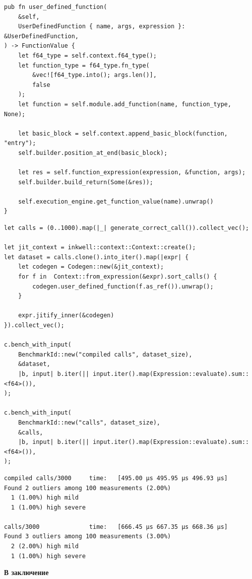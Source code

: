 \begin{frame}[fragile]
    \begin{verbatim}
pub fn user_defined_function(
    &self,
    UserDefinedFunction { name, args, expression }: &UserDefinedFunction,
) -> FunctionValue {
    let f64_type = self.context.f64_type();
    let function_type = f64_type.fn_type(
        &vec![f64_type.into(); args.len()],
        false
    );
    let function = self.module.add_function(name, function_type, None);

    let basic_block = self.context.append_basic_block(function, "entry");
    self.builder.position_at_end(basic_block);

    let res = self.function_expression(expression, &function, args);
    self.builder.build_return(Some(&res));

    self.execution_engine.get_function_value(name).unwrap()
}
    \end{verbatim}
\end{frame}

\begin{frame}[fragile]
    \begin{verbatim}
let calls = (0..1000).map(|_| generate_correct_call()).collect_vec();

let jit_context = inkwell::context::Context::create();
let dataset = calls.clone().into_iter().map(|expr| {
    let codegen = Codegen::new(&jit_context);
    for f in  Context::from_expression(&expr).sort_calls() {
        codegen.user_defined_function(f.as_ref()).unwrap();
    }

    expr.jitify_inner(&codegen)
}).collect_vec();

c.bench_with_input(
    BenchmarkId::new("compiled calls", dataset_size),
    &dataset,
    |b, input| b.iter(|| input.iter().map(Expression::evaluate).sum::<f64>()),
);

c.bench_with_input(
    BenchmarkId::new("calls", dataset_size),
    &calls,
    |b, input| b.iter(|| input.iter().map(Expression::evaluate).sum::<f64>()),
);
    \end{verbatim}
\end{frame}

\begin{frame}[fragile]
    \begin{lstlisting}[basicstyle=\fontsize{10pt}{12}\bf\ttfamily\color{black}]
compiled calls/3000     time:   [495.00 µs 495.95 µs 496.93 µs]
Found 2 outliers among 100 measurements (2.00%)
  1 (1.00%) high mild
  1 (1.00%) high severe

calls/3000              time:   [666.45 µs 667.35 µs 668.36 µs]
Found 3 outliers among 100 measurements (3.00%)
  2 (2.00%) high mild
  1 (1.00%) high severe
    \end{lstlisting}
\end{frame}

\begin{frame}
  \textbf{В заключение}
\end{frame}

